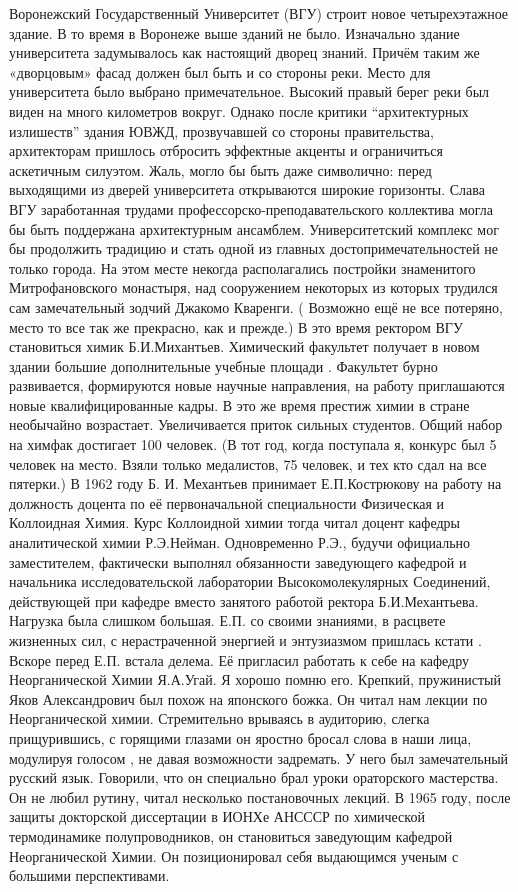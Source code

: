 Воронежский Государственный Университет (ВГУ) строит новое четырехэтажное здание. В то время в Воронеже выше зданий не было. Изначально здание университета задумывалось как настоящий дворец знаний. Причём таким же «дворцовым» фасад должен был быть и со стороны реки. Место для университета было выбрано примечательное. Высокий правый берег реки был виден на много километров вокруг. Однако после критики “архитектурных излишеств” здания ЮВЖД, прозвучавшей со стороны правительства, архитекторам пришлось отбросить эффектные акценты и ограничиться аскетичным силуэтом. Жаль, могло бы быть даже символично: перед выходящими из дверей университета открываются широкие горизонты. Слава ВГУ заработанная трудами профессорско-преподавательского коллектива могла бы быть поддержана архитектурным ансамблем. Университетский комплекс мог бы продолжить традицию и стать одной из главных достопримечательностей не только города. На этом месте некогда располагались постройки знаменитого Митрофановского монастыря, над сооружением некоторых из которых трудился сам замечательный зодчий Джакомо Кваренги. ( Возможно ещё не все потеряно, место то все так же прекрасно, как и прежде.)
В это время ректором ВГУ становиться химик Б.И.Михантьев. Химический факультет получает в новом здании большие дополнительные учебные площади . Факультет бурно развивается, формируются новые научные направления, на работу приглашаются новые квалифицированные кадры. В это же время престиж химии в стране необычайно возрастает. Увеличивается приток сильных студентов. Общий набор на химфак достигает 100 человек. (В тот год, когда поступала я, конкурс был 5 человек на место. Взяли только медалистов, 75 человек, и тех кто сдал на все пятерки.)
В 1962 году Б. И. Механтьев принимает Е.П.Кострюкову на работу на должность доцента по её первоначальной специальности Физическая и Коллоидная Химия. Курс Коллоидной химии тогда читал доцент кафедры аналитической химии Р.Э.Нейман. Одновременно Р.Э., будучи официально заместителем, фактически выполнял обязанности заведующего кафедрой и начальника исследовательской лаборатории Высокомолекулярных Соединений, действующей при кафедре вместо занятого работой ректора Б.И.Механтьева. Нагрузка была слишком большая. Е.П. со своими знаниями, в расцвете жизненных сил, с нерастраченной энергией и энтузиазмом пришлась кстати .
Вскоре перед Е.П. встала делема. Её пригласил работать к себе на кафедру Неорганической Химии Я.А.Угай. Я хорошо помню его. Крепкий, пружинистый Яков Александрович был похож на японского божка. Он читал нам лекции по Неорганической химии. Стремительно врываясь в аудиторию, слегка прищурившись, с горящими глазами он яростно бросал слова в наши лица, модулируя голосом , не давая возможности задремать. У него был замечательный русский язык. Говорили, что он специально брал уроки ораторского мастерства. Он не любил рутину, читал несколько постановочных лекций. В 1965 году, после защиты докторской диссертации в ИОНХе АНСССР по химической термодинамике полупроводников, он становиться заведующим кафедрой Неорганической Химии. Он позиционировал себя выдающимся ученым с большими перспективами.
